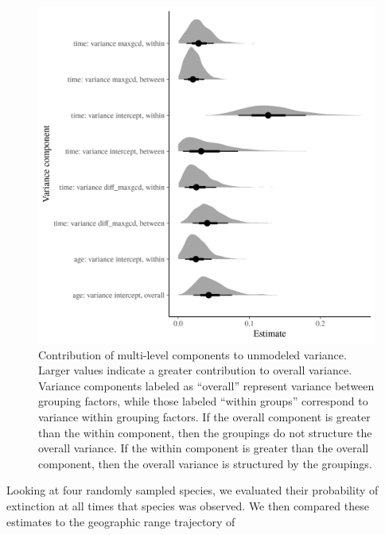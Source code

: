 \documentclass[12pt,letterpaper]{article}
\begin{document}
\begin{figure}[ht]
  \centering
  \includegraphics[width=\textwidth,height=0.5\textheight,keepaspectratio=true]{../results/figure/variance_components}
  \caption{Contribution of multi-level components to unmodeled variance. Larger values indicate a greater contribution to overall variance. Variance components labeled as ``overall'' represent variance between grouping factors, while those labeled  ``within groups'' correspond to variance within grouping factors. If the overall component is greater than the within component, then the groupings do not structure the overall variance. If the within component is greater than the overall component, then the overall variance is structured by the groupings.}
  \label{fig:variance_components}
\end{figure}



Looking at four randomly sampled species, we evaluated their probability of extinction at all times that species was observed. We then compared these estimates to the geographic range trajectory of 
\end{document}
